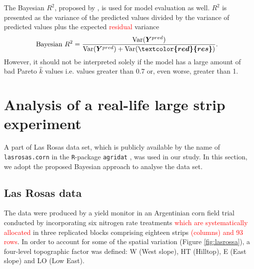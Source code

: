 \documentclass[a4paper]{article}   	%
\newcommand{\Var}{\mathrm{Var}}
\newcommand{\R}{\texttt{R}}
\begin{document}
	
	
	
	
	
	The Bayesian $R^2$, proposed by \textcite{Gelman2019Rsquared}, is used for model evaluation as well. $R^2$ is presented as the variance of the predicted values divided by the variance of predicted values plus the expected \textcolor{red}{residual} variance 
	\begin{eqnarray}
		\mbox{Bayesian } R^2 = \frac{\Var(\bm{Y}^{pred})}{\Var (\bm{Y}^{pred})+\Var(\bm{\textcolor{red}{res}})}.
	\end{eqnarray}
	However, it should not be interpreted solely if the model has a large amount of bad Pareto $\hat{k}$ values i.e. values greater than 0.7 or, even worse, greater than 1. 
	
	
	
	\section{Analysis of a real-life large strip experiment}\label{sec:analysis}
	
	A part of Las Rosas data set, which is publicly available by the name of \texttt{lasrosas.corn} in the \R-package \texttt{agridat} \parencite{Edmondson2014Agridat}, was used in our study. In this section, we adopt the proposed Bayesian approach to analyse the data set. 
	
	
	\subsection{Las Rosas data}
	
	The data were produced by a yield monitor in an Argentinian corn field trial conducted by incorporating six nitrogen rate treatments \textcolor{red}{which are systematically allocated} in three replicated blocks comprising eighteen strips \textcolor{red}{(columns) and 93 rows}. In order to account for some of the spatial variation (Figure \ref{fig:lasrossa}), a four-level topographic factor was defined: W (West slope), HT (Hilltop), E (East slope) and LO (Low East).  
	
\end{document}
